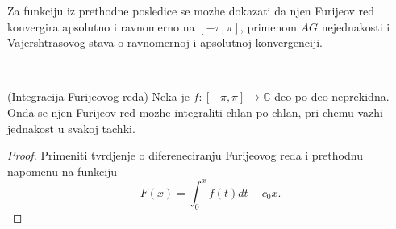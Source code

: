 \documentclass[a4paper,12pt]{article}
\newcommand{\CC}{\mathbb{C}}
\begin{document}
\begin{nap}
	Za funkciju iz prethodne posledice se mozhe dokazati da njen Furijeov red konvergira apsolutno i ravnomerno na $[-\pi, \pi]$,
	primenom $AG$ nejednakosti i Vajershtra\-sovog stava o ravnomernoj i apsolutnoj konvergenciji.
\end{nap}\\

\begin{tvr}(Integracija Furijeovog reda)
	Neka je $f:[-\pi, \pi] \to \CC$ deo-po-deo neprekidna. Onda se njen Furijeov red mozhe integraliti chlan po chlan, pri
	chemu vazhi jednakost u svakoj tachki.
\end{tvr}
\begin{proof}
	Primeniti tvrdjenje o difereneciranju Furijeovog reda i prethodnu napomenu na funkciju
	\[ F(x) = \int_0^xf(t)dt - c_0x .\] 
\end{proof}
\end{document}
